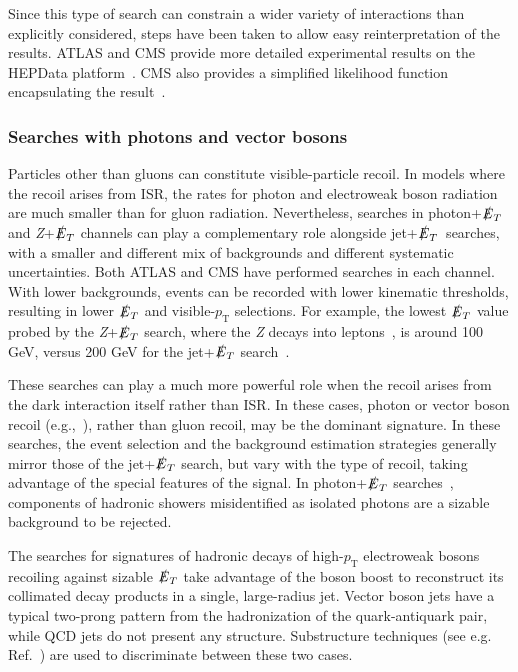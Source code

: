 \documentclass{ar-1col}
\newcommand{\pt}{\ensuremath{p_\mathrm{T}}\xspace}
\newcommand{\pT}{\ensuremath{p_\mathrm{T}}\xspace}
\newcommand{\MET}{\ensuremath{\slashed{E}_T}\xspace}
\begin{document}
Since this type of search can constrain a wider variety of
interactions than explicitly considered, steps have been taken to
allow easy reinterpretation of the results. ATLAS and CMS provide
more detailed experimental results on the HEPData
platform~\cite{Maguire:2017ypu}. CMS also provides a simplified
likelihood function encapsulating the
result~\cite{Collaboration:2242860,Sirunyan:2017jix}.

\subsubsection{Searches with photons and vector bosons}\label{subsub:monoV}

Particles other than gluons can constitute visible-particle
recoil. In models where the recoil arises from ISR, the rates
for photon and electroweak boson radiation are much smaller than
for gluon radiation. Nevertheless, searches in photon+\MET and
\textit{Z}+\MET channels can play a complementary role alongside jet+\MET\ searches,
with a smaller and different mix of backgrounds and different
systematic uncertainties. Both ATLAS and CMS have performed
searches in each channel. With lower backgrounds, events can be
recorded with lower kinematic thresholds, resulting in lower \MET
and visible-\pt{} selections. For example, the lowest \MET value
probed by the \textit{Z}+\MET search, where the \textit{Z} decays into
leptons~\cite{Sirunyan:2017qfc,Aaboud:2017bja}, is around 100 GeV,
versus 200 GeV for the jet+\MET search~\cite{Sirunyan:2017jix}.

These searches can play a much more powerful role when the recoil
arises from the dark interaction itself rather than ISR. In these
cases, photon or vector boson recoil
(e.g.,~), rather than gluon
recoil, may be the dominant signature. In these searches, the
event selection and the background estimation strategies generally
mirror those of the jet+\MET search, but vary with the type of
recoil, taking advantage of the special features of the signal. In
photon+\MET searches~\cite{Aaboud:2017dor,CMS-PAS-EXO-16-014},
components of hadronic showers misidentified as isolated photons
are a sizable background to be rejected. 

The searches for signatures of hadronic decays
of high-\pT{} electroweak bosons recoiling against sizable \MET
take advantage of the boson boost to reconstruct its collimated decay products
in a single, large-radius jet. 
Vector boson jets have a typical two-prong pattern from the hadronization
of the quark-antiquark pair, while QCD jets do not present any structure.
Substructure techniques (see e.g. Ref.~\cite{Larkoski:2017jix}) are
used to discriminate between these two cases. 
\end{document}
